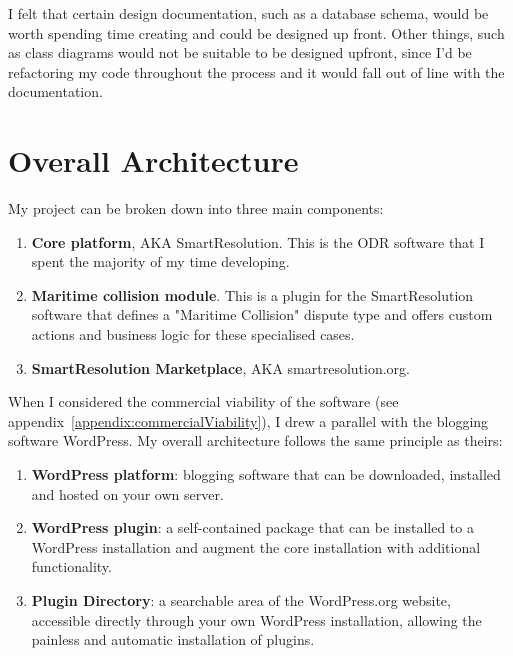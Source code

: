I felt that certain design documentation, such as a database schema, would be worth spending time creating and could be designed up front. Other things, such as class diagrams would not be suitable to be designed upfront, since I'd be refactoring my code throughout the process and it would fall out of line with the documentation.

\section{Overall Architecture}

My project can be broken down into three main components:

\begin{enumerate}
    \item \textbf{Core platform}, AKA SmartResolution. This is the ODR software that I spent the majority of my time developing.
    
    \item \textbf{Maritime collision module}. This is a plugin for the SmartResolution software that defines a "Maritime Collision" dispute type and offers custom actions and business logic for these specialised cases.
    
    \item \textbf{SmartResolution Marketplace}, AKA smartresolution.org. 
\end{enumerate}

When I considered the commercial viability of the software (see appendix~\ref{appendix:commercialViability}), I drew a parallel with the blogging software WordPress. My overall architecture follows the same principle as theirs:

\begin{enumerate}
    \item \textbf{WordPress platform}: blogging software that can be downloaded, installed and hosted on your own server.
    
    \item \textbf{WordPress plugin}: a self-contained package that can be installed to a WordPress installation and augment the core installation with additional functionality.
    
    \item \textbf{Plugin Directory}: a searchable area of the WordPress.org website, accessible directly through your own WordPress installation, allowing the painless and automatic installation of plugins. %
\end{enumerate}

